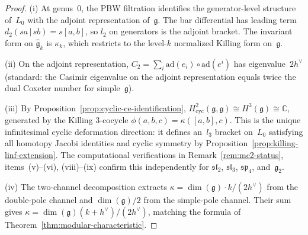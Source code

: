 \begin{proof}
(i)\enspace
At genus~$0$, the PBW filtration identifies the generator-level
structure of~$L_0$ with the adjoint representation
of~$\mathfrak{g}$.  The bar differential has leading term
$d_2(sa\,|\,sb) = s[a,b]$, so $l_2$ on generators is the adjoint
bracket.  The invariant form on $\widehat{\mathfrak{g}}_k$ is
$\kappa_k$, which restricts to the level-$k$ normalized Killing
form on~$\mathfrak{g}$.

(ii)\enspace
On the adjoint representation, $C_2 = \sum_i \mathrm{ad}(e_i)
\circ\mathrm{ad}(e^i)$ has eigenvalue~$2h^\vee$ (standard: the
Casimir eigenvalue on the adjoint representation equals twice the
dual Coxeter number for simple~$\mathfrak{g}$).

(iii)\enspace
By Proposition~\ref{prop:cyclic-ce-identification},
$H^2_{\mathrm{cyc}}(\mathfrak{g},\mathfrak{g})\cong
H^3(\mathfrak{g})\cong\mathbb{C}$, generated by the Killing
$3$-cocycle $\phi(a,b,c)=\kappa([a,b],c)$.  This is the unique
infinitesimal cyclic deformation direction: it defines
an~$l_3$ bracket on~$L_0$ satisfying all homotopy Jacobi
identities and cyclic symmetry by
Proposition~\ref{prop:killing-linf-extension}.
The computational verifications in
Remark~\ref{rem:mc2-status}, items~(v)--(vi),
(viii)--(ix) confirm this independently for
$\mathfrak{sl}_2$, $\mathfrak{sl}_3$,
$\mathfrak{sp}_4$, and~$\mathfrak{g}_2$.

(iv)\enspace
The two-channel decomposition extracts
$\kappa = \dim(\mathfrak{g})\cdot k/(2h^\vee)$ from the
double-pole channel and $\dim(\mathfrak{g})/2$ from the
simple-pole channel.  Their sum gives
$\kappa = \dim(\mathfrak{g})(k+h^\vee)/(2h^\vee)$, matching the
formula of Theorem~\ref{thm:modular-characteristic}.
\end{proof}

